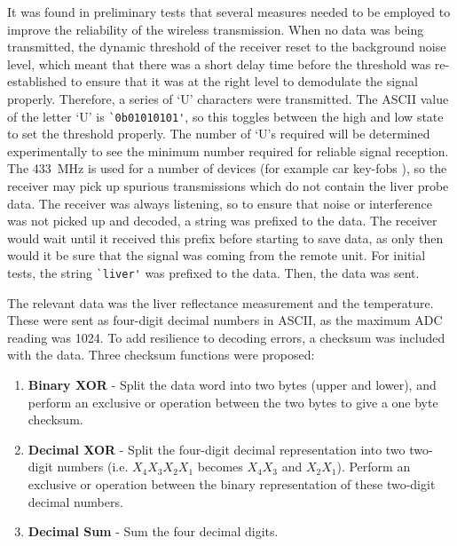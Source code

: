 It was found in preliminary tests that several measures needed to be employed to improve the reliability of the wireless transmission. When no data was being transmitted, the dynamic threshold of the receiver reset to the background noise level, which meant that there was a short delay time before the threshold was re-established to ensure that it was at the right level to demodulate the signal properly. Therefore, a series of `U' characters were transmitted. The ASCII value of the letter `U' is \verb|`0b01010101'|, so this toggles between the high and low state to set the threshold properly. The number of `U's required will be determined experimentally to see the minimum number required for reliable signal reception. The \SI{433}{\mega\hertz} is used for a number of devices (for example car key-fobs \cite{qam-rx10}), so the receiver may pick up spurious transmissions which do not contain the liver probe data. The receiver was always listening, so to ensure that noise or interference was not picked up and decoded, a string was prefixed to the data. The receiver would wait until it received this prefix before starting to save data, as only then would it be sure that the signal was coming from the remote unit. For initial tests, the string \verb|`liver'| was prefixed to the data. Then, the data was sent. 

The relevant data was the liver reflectance measurement and the temperature. These were sent as four-digit decimal numbers in ASCII, as the maximum ADC reading was 1024. To add resilience to decoding errors, a checksum was included with the data. Three checksum functions were proposed:
\begin{enumerate}
\item \label{check: binary xor} \textbf{Binary XOR} - Split the data word into two bytes (upper and lower), and perform an exclusive or operation between the two bytes to give a one byte checksum.
\item \label{check: decimal xor} \textbf{Decimal XOR} - Split the four-digit decimal representation into two two-digit numbers (i.e. $X_4X_3X_2X_1$ becomes $X_4X_3$ and $X_2X_1$). Perform an exclusive or operation between the binary representation of these two-digit decimal numbers.
\item \label{check: decimal sum} \textbf{Decimal Sum} - Sum the four decimal digits.
\end{enumerate}

